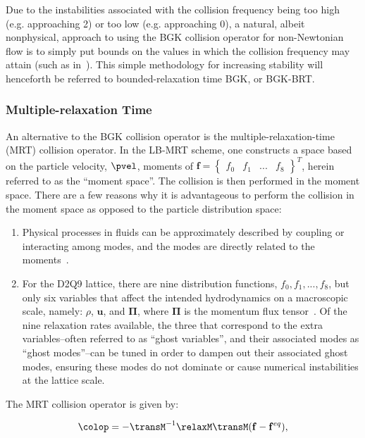 Due to the instabilities associated with the collision frequency being too high (e.g. approaching 2) or too low (e.g. approaching 0), a natural, albeit nonphysical, approach to using the BGK collision operator for non-Newtonian flow is to simply put bounds on the values in which the collision frequency may attain (such as in~\citet{svec2011flow,svec2012free,gabbanelli2005lattice}).
This simple methodology for increasing stability will henceforth be referred to bounded-relaxation time BGK, or BGK-BRT.

\subsubsection{Multiple-relaxation Time} \label{sec:mrt}

An alternative to the BGK collision operator is the multiple-relaxation-time (MRT) collision operator.
In the LB-MRT scheme, one constructs a space based on the particle velocity, $\pvel$, moments of $\mathbf{f} = \begin{Bmatrix}f_0 & f_1 & ... & f_8\end{Bmatrix}^T$, herein referred to as the ``moment space''.
The collision is then performed in the moment space.
There are a few reasons why it is advantageous to perform the collision in the moment space as opposed to the particle distribution space:
\begin{enumerate}
    \item Physical processes in fluids can be approximately described by coupling or interacting among modes, and the modes are directly related to the moments~\cite{lallemand2000theory}.
    \item For the D2Q9 lattice, there are nine distribution functions, $f_0, f_1, ..., f_8$, but only six variables that affect the intended hydrodynamics on a macroscopic scale, namely: $\rho$, $\mathbf{u}$, and $\mathbf{\Pi}$, where $\mathbf{\Pi}$ is the momentum flux tensor~\cite{dellar2003incompressible}.
    Of the nine relaxation rates available, the three that correspond to the extra variables--often referred to as ``ghost variables'', and their associated modes as ``ghost modes''--can be tuned in order to dampen out their associated ghost modes, ensuring these modes do not dominate or cause numerical instabilities at the lattice scale.
\end{enumerate}

The MRT collision operator is given by:

\begin{equation} \label{eq:mrt-colop}
	\colop = - {\transM}^{-1} \relaxM \transM (\mathbf{f} - \mathbf{f}^{eq}),
\end{equation}

